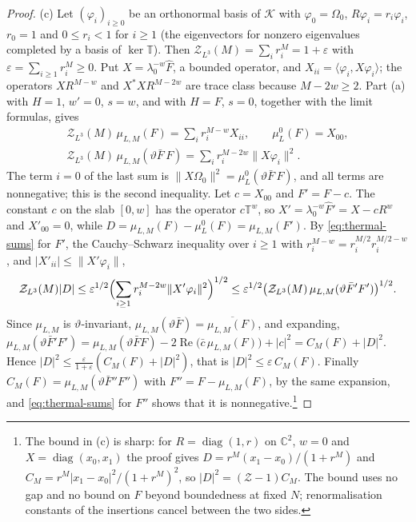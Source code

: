 \documentclass[11pt,a4paper]{amsart}
\theoremstyle{definition}
\theoremstyle{remark}
\numberwithin{equation}{section}
\newcommand{\C}{\mathbb{C}}          %
\newcommand{\Kspace}{\mathcal{K}}    %
\newcommand{\ip}[2]{\langle #1,#2\rangle}  %
\newcommand{\norm}[1]{\lVert #1\rVert}     %
\newcommand{\abs}[1]{\lvert #1\rvert}      %
\newcommand{\TT}{\mathbb{T}}               %
\newcommand{\Zc}{\mathcal{Z}}              %
\newcommand{\Zs}[2]{\Zc_{#1}(#2)}          %
\newcommand{\lzero}{\lambda_0}             %
\newcommand{\Omegazero}{\Omega_0}          %
\begin{document}
\begin{proof}
(c) Let $(\varphi_i)_{i\ge0}$ be an orthonormal basis of $\Kspace$ with $\varphi_0=\Omegazero$, $R\varphi_i=r_i\varphi_i$, $r_0=1$ and $0\le r_i<1$ for $i\ge1$ (the eigenvectors for nonzero eigenvalues completed by a basis of $\ker\TT$). Then $\Zs{L^3}{M}=\sum_ir_i^M=1+\varepsilon$ with $\varepsilon=\sum_{i\ge1}r_i^M\ge0$. Put $X=\lzero^{-w}\hat F$, a bounded operator, and $X_{ii}=\ip{\varphi_i}{X\varphi_i}$; the operators $XR^{M-w}$ and $X^*XR^{M-2w}$ are trace class because $M-2w\ge2$. Part (a) with $H=1$, $w'=0$, $s=w$, and with $H=F$, $s=0$, together with the limit formulas, gives
\begin{equation}\label{eq:thermal-sums}
\begin{gathered}
\Zs{L^3}{M}\,\mu_{L,M}(F)=\sum_ir_i^{M-w}X_{ii},\qquad \mu^0_L(F)=X_{00},\\
\Zs{L^3}{M}\,\mu_{L,M}(\vartheta\bar F\,F)=\sum_ir_i^{M-2w}\norm{X\varphi_i}^2 .
\end{gathered}
\end{equation}
The term $i=0$ of the last sum is $\norm{X\Omegazero}^2=\mu^0_L(\vartheta\bar F\,F)$, and all terms are nonnegative; this is the second inequality. Let $c=X_{00}$ and $F'=F-c$. The constant $c$ on the slab $[0,w]$ has the operator $c\TT^w$, so $X'=\lzero^{-w}\hat F'=X-cR^w$ and $X'_{00}=0$, while $D=\mu_{L,M}(F)-\mu^0_L(F)=\mu_{L,M}(F')$. By \eqref{eq:thermal-sums} for $F'$, the Cauchy--Schwarz inequality over $i\ge1$ with $r_i^{M-w}=r_i^{M/2}r_i^{M/2-w}$, and $\abs{X'_{ii}}\le\norm{X'\varphi_i}$,
\[
\Zs{L^3}{M}\abs{D}\le\varepsilon^{1/2}\Bigl(\sum_{i\ge1}r_i^{M-2w}\norm{X'\varphi_i}^2\Bigr)^{1/2}\le\varepsilon^{1/2}\bigl(\Zs{L^3}{M}\,\mu_{L,M}(\vartheta\bar F'F')\bigr)^{1/2}.
\]
Since $\mu_{L,M}$ is $\vartheta$-invariant, $\mu_{L,M}(\vartheta\bar F)=\overline{\mu_{L,M}(F)}$, and expanding, $\mu_{L,M}(\vartheta\bar F'F')=\mu_{L,M}(\vartheta\bar FF)-2\operatorname{Re}\bigl(\bar c\,\mu_{L,M}(F)\bigr)+\abs{c}^2=C_M(F)+\abs{D}^2$. Hence $\abs{D}^2\le\frac{\varepsilon}{1+\varepsilon}(C_M(F)+\abs{D}^2)$, that is $\abs{D}^2\le\varepsilon\,C_M(F)$. Finally $C_M(F)=\mu_{L,M}(\vartheta\bar F''F'')$ with $F''=F-\mu_{L,M}(F)$, by the same expansion, and \eqref{eq:thermal-sums} for $F''$ shows that it is nonnegative.\footnote{The bound in (c) is sharp: for $R=\operatorname{diag}(1,r)$ on $\C^2$, $w=0$ and $X=\operatorname{diag}(x_0,x_1)$ the proof gives $D=r^M(x_1-x_0)/(1+r^M)$ and $C_M=r^M\abs{x_1-x_0}^2/(1+r^M)^2$, so $\abs{D}^2=(\Zc-1)C_M$. The bound uses no gap and no bound on $F$ beyond boundedness at fixed $N$; renormalisation constants of the insertions cancel between the two sides.}
\end{proof}
\end{document}
